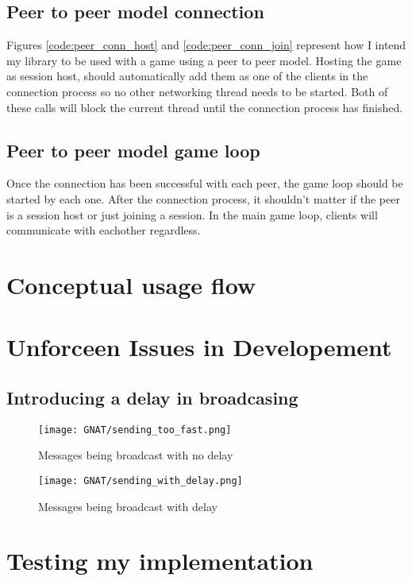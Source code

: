 


\newpage
\subsection{Peer to peer model connection}
Figures \ref{code:peer_conn_host} and \ref{code:peer_conn_join} represent how I intend my library to be used with a game using a peer to peer model. Hosting the game as session host, should automatically add them as one of the clients in the connection process so no other networking thread needs to be started. Both of these calls will block the current thread until the connection process has finished.




\newpage
\subsection{Peer to peer model game loop}
Once the connection has been successful with each peer, the game loop should be started by each one. After the connection process, it shouldn't matter if the peer is a session host or just joining a session. In the main game loop, clients will communicate with eachother regardless.





\newpage
\section{Conceptual usage flow}



\section{Unforceen Issues in Developement}
\subsection{Introducing a delay in broadcasing}
\newpage
\vfill
\begin{figure}[!h]
  \centering
  \texttt{[image: GNAT/sending\_too\_fast.png]}
  \caption{Messages being broadcast with no delay}
  \label{fig:broadcast_too_fast}
\end{figure}

\begin{figure}[!h]
  \centering
  \texttt{[image: GNAT/sending\_with\_delay.png]}
  \caption{Messages being broadcast with delay}
  \label{fig:broadcast_with_delay}
\end{figure}
\vfill
\newpage

\section{Testing my implementation}

